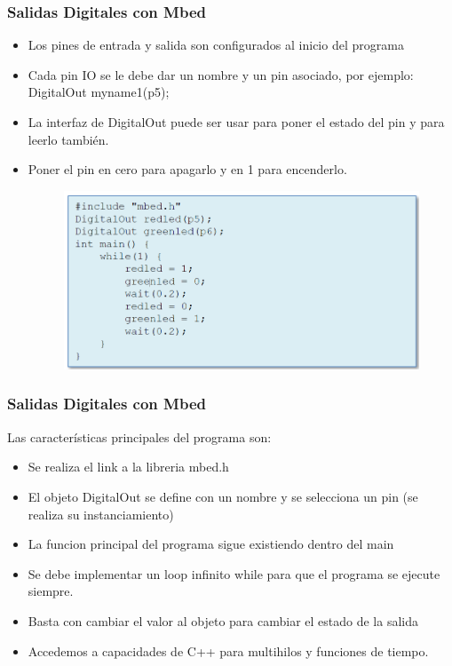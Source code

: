 \documentclass[10.5pt,scale=1.0,t,aspectratio=169,hyperref={pdfpagelabels=false}]{beamer}
\begin{document}
\begin{frame}
	\frametitle{Salidas Digitales con Mbed}
	\begin{itemize}
		\item Los pines de entrada y salida son configurados al inicio del programa
		\item Cada pin IO se le debe dar un nombre y un pin asociado, por ejemplo: DigitalOut myname1(p5);
		\item La interfaz de DigitalOut puede ser usar para poner el estado del pin y para leerlo también.
		\item Poner el pin en cero para apagarlo y en 1 para encenderlo.
		\begin{figure}
			\centering
			\includegraphics[scale=0.5]{04_EjemploDigitalOut}
		\end{figure}
	\end{itemize}
\end{frame}
\begin{frame}
	\frametitle{Salidas Digitales con Mbed}
	Las características principales del programa son:
	\begin{itemize}
		\item Se realiza el link a la libreria mbed.h
		\item El objeto DigitalOut se define con un nombre y se selecciona un pin (se realiza su instanciamiento) 
		\item La funcion principal del programa sigue existiendo dentro del main
		\item Se debe implementar un loop infinito while para que el programa se ejecute siempre.
		\item Basta con cambiar el valor al objeto para cambiar el estado de la salida
		\item Accedemos a capacidades de C++ para multihilos y funciones de tiempo. 
	\end{itemize}
\end{frame}
\end{document}
